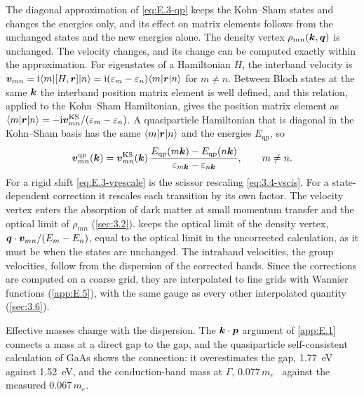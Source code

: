 The diagonal approximation of \cref{eq:E.3-qp} keeps the Kohn--Sham states and changes the energies only, and its effect on matrix elements follows from the unchanged states and the new energies alone. The density vertex $\rho_{mn}(\bm{k}, \bm{q})$ is unchanged. The velocity changes, and its change can be computed exactly within the approximation. For eigenstates of a Hamiltonian $H$, the interband velocity is $\bm{v}_{mn} = \mathrm{i}\langle m|[H, \bm{r}]|n\rangle = \mathrm{i}(\varepsilon_m - \varepsilon_n)\langle m|\bm{r}|n\rangle$ for $m \neq n$. Between Bloch states at the same $\bm{k}$ the interband position matrix element is well defined, and this relation, applied to the Kohn--Sham Hamiltonian, gives the position matrix element as $\langle m|\bm{r}|n\rangle = -\mathrm{i}\bm{v}^{\mathrm{KS}}_{mn}/(\varepsilon_m - \varepsilon_n)$. A quasiparticle Hamiltonian that is diagonal in the Kohn--Sham basis has the same $\langle m|\bm{r}|n\rangle$ and the energies $E_{\mathrm{qp}}$, so
\begin{equation}
  \bm{v}^{\mathrm{qp}}_{mn}(\bm{k}) = \bm{v}^{\mathrm{KS}}_{mn}(\bm{k})\,\frac{E_{\mathrm{qp}}(m\bm{k}) - E_{\mathrm{qp}}(n\bm{k})}{\varepsilon_{m\bm{k}} - \varepsilon_{n\bm{k}}} , \qquad m \neq n .
  \label{eq:E.3-vrescale}
\end{equation}
For a rigid shift \cref{eq:E.3-vrescale} is the scissor rescaling \cref{eq:3.4-vscis}. For a state-dependent correction it rescales each transition by its own factor. The velocity vertex enters the absorption of dark matter at small momentum transfer and the optical limit of $\rho_{mn}$ (\cref{sec:3.2}).  keeps the optical limit of the density vertex, $\bm{q}\cdot\bm{v}_{mn}/(E_m - E_n)$, equal to the optical limit in the uncorrected calculation, as it must be when the states are unchanged. The intraband velocities, the group velocities, follow from the dispersion of the corrected bands. Since the corrections are computed on a coarse grid, they are interpolated to fine grids with Wannier functions (\cref{app:E.5}), with the same gauge as every other interpolated quantity (\cref{sec:3.6}).

Effective masses change with the dispersion. The $\bm{k}\cdot\bm{p}$ argument of \cref{app:E.1} connects a mass at a direct gap to the gap, and the quasiparticle self-consistent calculation of GaAs shows the connection: it overestimates the gap, \SI{1.77}{eV} against \SI{1.52}{eV}, and the conduction-band mass at $\Gamma$, $0.077\,m_e$~\cite[Fig.~2 and text]{vanschilfgaarde2006quasiparticle} against the measured $0.067\,m_e$.

